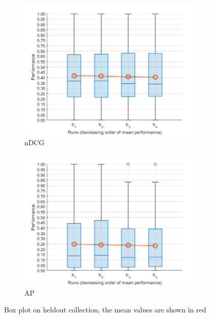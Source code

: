 \begin{figure}[tbp]
     \centering
     \begin{subfigure}[b]{0.45\textwidth}
         \centering
         \includegraphics[width=\textwidth]{figure/heldout-ndcg-boxplot.png}
         \caption{\ac{nDCG}}
     \end{subfigure}
     \hfill
     \begin{subfigure}[b]{0.45\textwidth}
         \centering
         \includegraphics[width=\textwidth]{figure/heldout-map-boxplot.png}
         \caption{\ac{AP}}
     \end{subfigure}
        \caption{Box plot on heldout collection, the mean values are shown in red}
        \label{fig:heldout-boxplot}
\end{figure}

